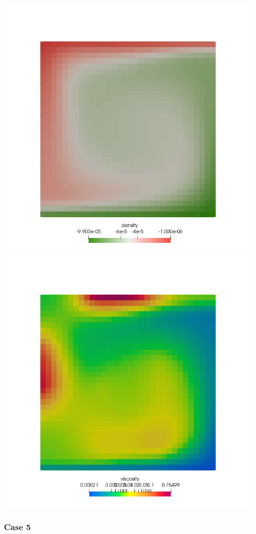 \begin{center}
\includegraphics[width=7.cm]{python_codes/fieldstone_28/results_case4/rho}
\includegraphics[width=7.cm]{python_codes/fieldstone_28/results_case4/mueff}
\end{center}

\newpage %
\subsubsection*{Case 5}

